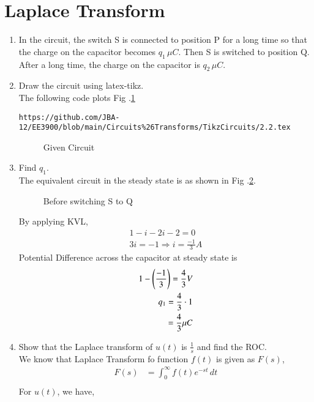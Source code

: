\documentclass[journal,12pt,twocolumn]{IEEEtran}
\renewcommand\thesection{\arabic{section}}
\begin{document}
\section{Laplace Transform}
\begin{enumerate}[label=\arabic*.,ref=\thesection.\theenumi]
\item In the circuit, the switch S is connected to position P for a long time so that the charge on the capacitor
	becomes $q_1 \, \mu C$. Then S is switched to position Q.  After a long time, the charge on the capacitor is $q_2 \, \mu C$.
\item Draw the circuit using latex-tikz.\\
\solution The following code plots Fig .\ref{fig:ckt}
\begin{lstlisting}
https://github.com/JBA-12/EE3900/blob/main/Circuits%26Transforms/TikzCircuits/2.2.tex
\end{lstlisting}
\begin{figure}[!ht]
\centering

\caption{Given Circuit}
\label{fig:ckt}
\end{figure}
\item Find $q_1$.\\
\solution The equivalent circuit in the steady state is as shown in Fig .\ref{fig:ckt-q1}.
\begin{figure}[!ht]
   
\caption{Before switching S to Q}
\label{fig:ckt-q1}
\end{figure}
By applying KVL,
\begin{align}
1-i-2i-2=0\\
3i=-1 \Rightarrow i=\frac{-1}{3}A
\end{align}
Potential Difference across the capacitor at steady state is
\begin{align}
1-\left(\frac{-1}{3}\right)=\frac{4}{3}V\\
q_1=\frac{4}{3} \cdot 1\\
=\frac{4}{3} \mu C
\end{align}
\item Show that the Laplace transform of $u(t)$ is $\frac{1}{s}$ and find the ROC.\\
\solution We know that Laplace Transform fo function $f(t)$ is given as $F(s)$,
\begin{align}
\label{eq:LaplaceTrans}
F(s)&= \int_{0}^{\infty} f(t)e^{-st} \,dt \\
\end{align}
For $u(t)$, we have,
\begin{align}

\end{align}
\end{enumerate}
\end{document}
